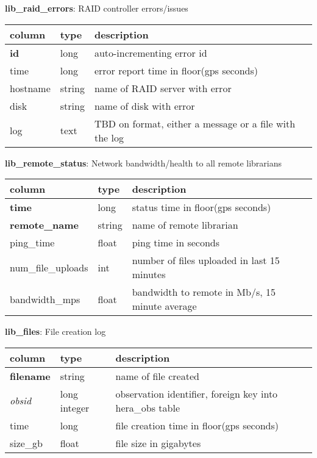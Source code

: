 \documentclass{article}
\begin{document}
\textbf{\large{lib\_raid\_errors}}: RAID controller errors/issues
\begin{center}
 \begin{tabular}{| p{4cm} | p{2cm} | p{10cm} |} 
\hline
 column & type & description \\ [0.5ex]  \hline\hline
\textbf{id} & long & auto-incrementing error id\\ \hline
time & long & error report time in floor(gps seconds)\\ \hline
hostname & string & name of RAID server with error \\ \hline
disk & string & name of disk with error \\ \hline
log & text & TBD on format, either a message or a file with the log \\\hline
\end{tabular}
\end{center}

\textbf{\large{lib\_remote\_status}}: Network bandwidth/health to all remote librarians
\begin{center}
 \begin{tabular}{| p{4cm} | p{2cm} | p{10cm} |} 
\hline
 column & type & description \\ [0.5ex]  \hline\hline
\textbf{time} & long & status time in floor(gps seconds)\\ \hline
\textbf{remote\_name} & string & name of remote librarian \\ \hline
ping\_time & float & ping time in seconds \\\hline
num\_file\_uploads & int & number of files uploaded in last 15 minutes  \\\hline
bandwidth\_mps & float & bandwidth to remote in Mb/s, 15 minute average \\\hline
\end{tabular}
\end{center}

\textbf{\large{lib\_files}}: File creation log
\begin{center}
 \begin{tabular}{| p{4cm} | p{2cm} | p{10cm} |} 
\hline
 column & type & description \\ [0.5ex]  \hline\hline
\textbf{filename} & string & name of file created \\ \hline
\textit{obsid} & long integer & observation identifier, foreign key into hera\_obs table \\ \hline
time & long & file creation time in floor(gps seconds)\\ \hline
size\_gb & float & file size in gigabytes \\ \hline
\end{tabular}
\end{center}
\end{document}

